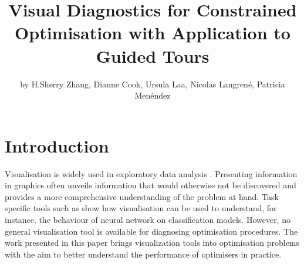 \title{Visual Diagnostics for Constrained Optimisation with Application to
Guided Tours}
\author{by H.Sherry Zhang, Dianne Cook, Ursula Laa, Nicolas Langrené, Patricia Menéndez}

\maketitle


\hypertarget{introduction}{%
\section{Introduction}\label{introduction}}

Visualisation is widely used in exploratory data analysis
\citep{tukey1977exploratory, unwin2015graphical, healy2018data, wilke2019fundamentals}.
Presenting information in graphics often unveils information that would
otherwise not be discovered and provides a more comprehensive
understanding of the problem at hand. Task specific tools such as
\citet{li2020visualizing} show how visualisation can be used to
understand, for instance, the behaviour of neural network on
classification models. However, no general visualisation tool is
available for diagnosing optimisation procedures. The work presented in
this paper brings visualization tools into optimisation problems with
the aim to better understand the performance of optimisers in practice.

